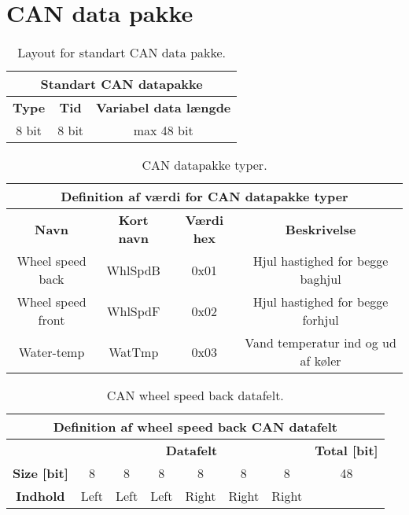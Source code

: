 \section{CAN data pakke}

\begin{table}[H] \centering
	\begin{tabular}{|c|c|c|}
        \hline \multicolumn{3}{|c|}{\textbf{Standart CAN datapakke}} \\
	    \hline \hline \textbf{Type} & \textbf{Tid}& \textbf{Variabel data længde}\\
        \hline 8 bit & 8 bit & max 48 bit \\ 
        \hline
    \end{tabular}
\caption{Layout for standart CAN data pakke.}
\label{table:std_can_pakke}
\end{table}

\begin{table}[H] \centering
	\begin{tabular}{|c|c|c|c|}
        \hline \multicolumn{4}{|c|}{\textbf{Definition af værdi for CAN datapakke typer}} \\
	    \hline \hline \textbf{Navn} & \textbf{Kort navn} & \textbf{Værdi hex}& \textbf{Beskrivelse}\\
        \hline Wheel speed back & WhlSpdB & 0x01 & Hjul hastighed for begge baghjul\\
        \hline Wheel speed front & WhlSpdF & 0x02 & Hjul hastighed for begge forhjul\\
	\hline Water-temp & WatTmp & 0x03 & Vand temperatur ind og ud af køler\\
        \hline
    \end{tabular}
\caption{CAN datapakke typer.}
\label{table:CAN_data_typer}
\end{table}

\begin{table}[H] \centering
	\begin{tabular}{|c||c|c|c|c|c|c|c|}
        \hline \multicolumn{8}{|c|}{\textbf{Definition af wheel speed back CAN datafelt}} \\
	    \hline \hline & \multicolumn{6}{|c|}{\textbf{Datafelt}} & \textbf{Total [bit]}\\ 
        \hline \textbf{Size [bit]} & 8 & 8 & 8 & 8 & 8 & 8 & 48 \\
        \hline \textbf{Indhold} & Left & Left & Left & Right & Right & Right & \\
        \hline
    \end{tabular}
\caption{CAN wheel speed back datafelt.}
\label{table:CAN_WhlSpdB_pakke}
\end{table}


